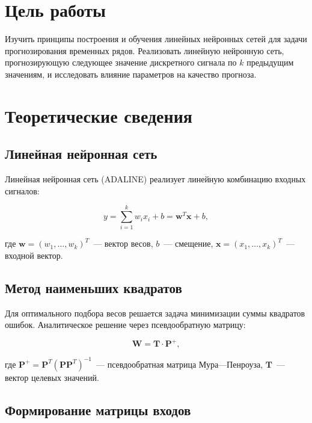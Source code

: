 \documentclass[14pt,a4paper]{extarticle}
\begin{document}

\tableofcontents

\newpage

\section{Цель работы}

Изучить принципы построения и обучения линейных нейронных сетей для задачи прогнозирования временных рядов. Реализовать линейную нейронную сеть, прогнозирующую следующее значение дискретного сигнала по $k$ предыдущим значениям, и исследовать влияние параметров на качество прогноза.

\section{Теоретические сведения}

\subsection{Линейная нейронная сеть}

Линейная нейронная сеть (ADALINE) реализует линейную комбинацию входных сигналов:

\begin{equation}
y = \sum_{i=1}^{k} w_i x_i + b = \mathbf{w}^T \mathbf{x} + b,
\end{equation}

где $\mathbf{w} = (w_1, \ldots, w_k)^T$~--- вектор весов, $b$~--- смещение, $\mathbf{x} = (x_1, \ldots, x_k)^T$~--- входной вектор.

\subsection{Метод наименьших квадратов}

Для оптимального подбора весов решается задача минимизации суммы квадратов ошибок. Аналитическое решение через псевдообратную матрицу:

\begin{equation}
\mathbf{W} = \mathbf{T} \cdot \mathbf{P}^+,
\end{equation}

где $\mathbf{P}^+ = \mathbf{P}^T (\mathbf{P} \mathbf{P}^T)^{-1}$~--- псевдообратная матрица Мура---Пенроуза, $\mathbf{T}$~--- вектор целевых значений.

\subsection{Формирование матрицы входов}
\end{document}
